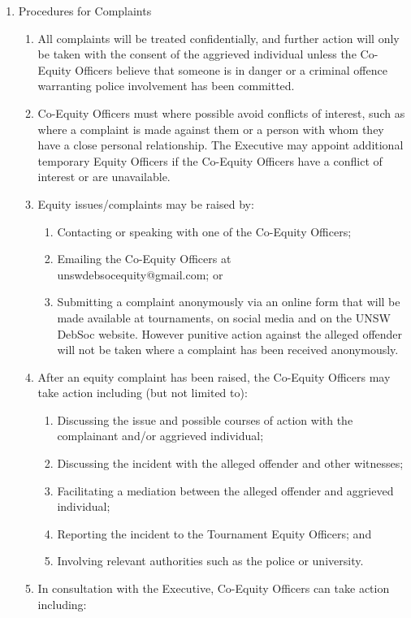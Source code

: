 \begin{enumerate}
\item Procedures for Complaints
  \begin{enumerate}
  \item All complaints will be treated confidentially, and further action will only be taken with the consent of the aggrieved individual unless the Co-Equity Officers believe that someone is in danger or a criminal offence warranting police involvement has been committed.
  \item Co-Equity Officers must where possible avoid conflicts of interest, such as where a complaint is made against them or a person with whom they have a close personal relationship. The Executive may appoint additional temporary Equity Officers if the Co-Equity Officers have a conflict of interest or are unavailable.
  \item Equity issues/complaints may be raised by:
    \begin{enumerate}
    \item Contacting or speaking with one of the Co-Equity Officers;
    \item Emailing the Co-Equity Officers at \\unswdebsocequity@gmail.com; or
    \item Submitting a complaint anonymously via an online form that will be made available at tournaments, on social media and on the UNSW DebSoc website. However punitive action against the alleged offender will not be taken where a complaint has been received anonymously.
    \end{enumerate}
  \item After an equity complaint has been raised, the Co-Equity Officers may take action including (but not limited to):
    \begin{enumerate}
    \item Discussing the issue and possible courses of action with the complainant and/or aggrieved individual;
    \item Discussing the incident with the alleged offender and other witnesses;
    \item Facilitating a mediation between the alleged offender and aggrieved individual;
    \item Reporting the incident to the Tournament Equity Officers; and
    \item Involving relevant authorities such as the police or university.
    \end{enumerate}
  \item In consultation with the Executive, Co-Equity Officers can take action including:

\end{enumerate}
\end{enumerate}

